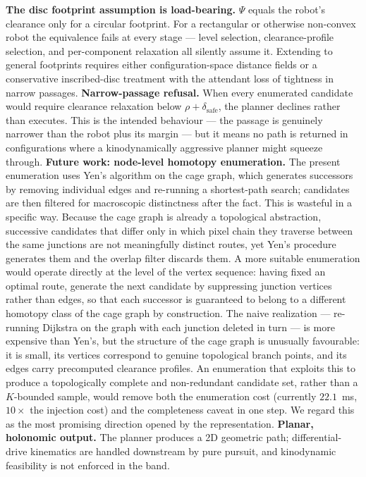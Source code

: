 \documentclass[conference]{IEEEtran}
\begin{document}
\textbf{The disc footprint assumption is load-bearing.} $\Psi$ equals the robot's clearance only for a circular footprint. For a rectangular or otherwise non-convex robot the equivalence fails at every stage --- level selection, clearance-profile selection, and per-component relaxation all silently assume it. Extending to general footprints requires either configuration-space distance fields or a conservative inscribed-disc treatment with the attendant loss of tightness in narrow passages.
\textbf{Narrow-passage refusal.} When every enumerated candidate would require clearance relaxation below $\rho+\delta_{\mathrm{safe}}$, the planner declines rather than executes. This is the intended behaviour --- the passage is genuinely narrower than the robot plus its margin --- but it means no path is returned in configurations where a kinodynamically aggressive planner might squeeze through.
\textbf{Future work: node-level homotopy enumeration.} The present enumeration uses Yen's algorithm on the cage graph, which generates successors by removing individual edges and re-running a shortest-path search; candidates are then filtered for macroscopic distinctness after the fact. This is wasteful in a specific way. Because the cage graph is already a topological abstraction, successive candidates that differ only in which pixel chain they traverse between the same junctions are not meaningfully distinct routes, yet Yen's procedure generates them and the overlap filter discards them. A more suitable enumeration would operate directly at the level of the vertex sequence: having fixed an optimal route, generate the next candidate by suppressing junction vertices rather than edges, so that each successor is guaranteed to belong to a different homotopy class of the cage graph by construction. The naive realization --- re-running Dijkstra on the graph with each junction deleted in turn --- is more expensive than Yen's, but the structure of the cage graph is unusually favourable: it is small, its vertices correspond to genuine topological branch points, and its edges carry precomputed clearance profiles. An enumeration that exploits this to produce a topologically complete and non-redundant candidate set, rather than a $K$-bounded sample, would remove both the enumeration cost (currently $22.1$~ms, $10\times$ the injection cost) and the completeness caveat in one step. We regard this as the most promising direction opened by the representation.
\textbf{Planar, holonomic output.} The planner produces a 2D geometric path; differential-drive kinematics are handled downstream by pure pursuit, and kinodynamic feasibility is not enforced in the band.
\end{document}
